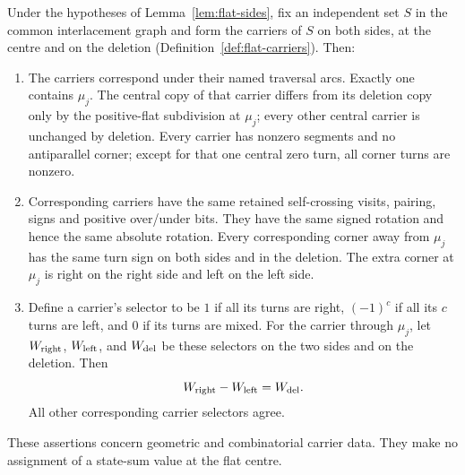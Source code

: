 \begin{corollary}\label{cor:flat-carriers}
Under the hypotheses of Lemma~\ref{lem:flat-sides}, fix an independent
set $S$ in the common interlacement graph and form the carriers of $S$ on
both sides, at the centre and on the deletion
(Definition~\ref{def:flat-carriers}). Then:
\begin{enumerate}
\item[(i)] The carriers correspond under their named traversal arcs.
Exactly one contains $\mu_j$. The central copy of that carrier differs
from its deletion copy only by the positive-flat subdivision at $\mu_j$;
every other central carrier is unchanged by deletion. Every carrier
has nonzero segments and no antiparallel corner; except for that one
central zero turn, all corner turns are nonzero.
\item[(ii)] Corresponding carriers have the same retained self-crossing
visits, pairing, signs and positive over/under bits. They have the same
signed rotation and hence the same absolute rotation. Every corresponding
corner away from $\mu_j$ has the same turn sign on both sides and in
the deletion. The extra corner at $\mu_j$ is right on the right side
and left on the left side.
\item[(iii)] Define a carrier's selector to be $1$ if all its turns are
right, $(-1)^c$ if all its $c$ turns are left, and $0$ if its turns are
mixed. For the carrier through $\mu_j$, let $W_{\rm right}$,
$W_{\rm left}$, and $W_{\rm del}$ be these selectors on the two sides
and on the deletion. Then
\begin{equation}\label{flatpr:selector-identity}
W_{\rm right}-W_{\rm left}=W_{\rm del}.
\end{equation}
All other corresponding carrier selectors agree.
\end{enumerate}
These assertions concern geometric and combinatorial carrier data.
They make no assignment of a state-sum value at the flat centre.
\end{corollary}

